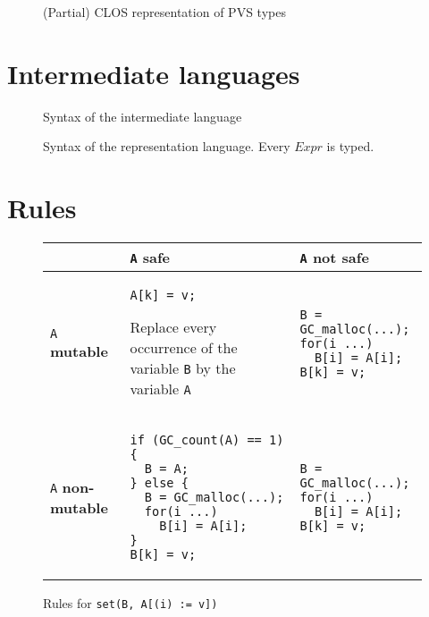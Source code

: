 \documentclass[12pt,a4paper]{article}
\newcommand{\cl}[1]{\texttt{#1}}
\newcommand{\mut}{\textbf{mutable }}
\newcommand{\nmut}{\textbf{non-mutable }}
\newcommand{\safe}{\textbf{safe }}
\begin{document}
\begin{figure}[!ht]

\caption{(Partial) CLOS representation of PVS types}
\label{fig:PVS-CLOS-types}
\end{figure}


\newpage
\section{Intermediate languages}

\begin{figure}[!ht]

\caption{Syntax of the intermediate language}
\label{fig:aux-syntax}
\end{figure}

\newpage
\begin{figure}[!ht]

\caption{Syntax of the representation language. Every $Expr$ is typed.}
\label{fig:Csyntax}
\end{figure}



\newpage
\section{Rules}
\label{Rules}


\begin{figure}[!ht]
\begin{tabular}{|p{4.5cm}|p{6cm}|p{6.5cm}|}
\hline
             & \cl{A} \safe & \cl{A} not \safe \\ \hline
\cl{A} \mut  &
\begin{lstlisting}
A[k] = v;
\end{lstlisting}
Replace every occurrence of the variable \cl{B} by the variable \cl{A} & \begin{lstlisting}
B = GC_malloc(...);
for(i ...)
  B[i] = A[i];
B[k] = v;
\end{lstlisting} \\ \hline
\cl{A} \nmut & \begin{lstlisting}
if (GC_count(A) == 1) {
  B = A;
} else {
  B = GC_malloc(...);
  for(i ...)
    B[i] = A[i];
}
B[k] = v;
\end{lstlisting} & \begin{lstlisting}
B = GC_malloc(...);
for(i ...)
  B[i] = A[i];
B[k] = v;
\end{lstlisting} \\ \hline
\end{tabular}
\caption{Rules for \cl{set(B, A[(i) := v])}}
\end{figure}
\end{document}
